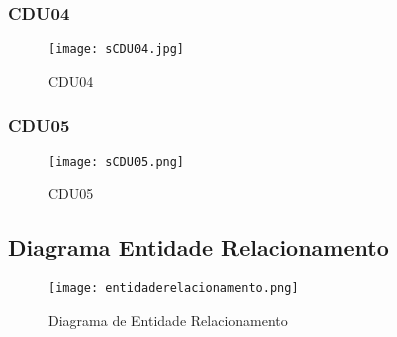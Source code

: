 \begin{landscape}
\subsubsection{CDU04}
\begin{figure}[htb]
	\centering
	\texttt{[image: sCDU04.jpg]}
	\caption{CDU04}
\end{figure}
\clearpage
%
\subsubsection{CDU05}
\begin{figure}[htb]
	\centering
	\texttt{[image: sCDU05.png]}
	\caption{CDU05}
\end{figure}
\clearpage
%



\subsection{Diagrama Entidade Relacionamento}
\begin{figure}[htb]
	\centering
	\texttt{[image: entidaderelacionamento.png]}
	\caption{Diagrama de Entidade Relacionamento}
\end{figure}
\clearpage

\end{landscape}